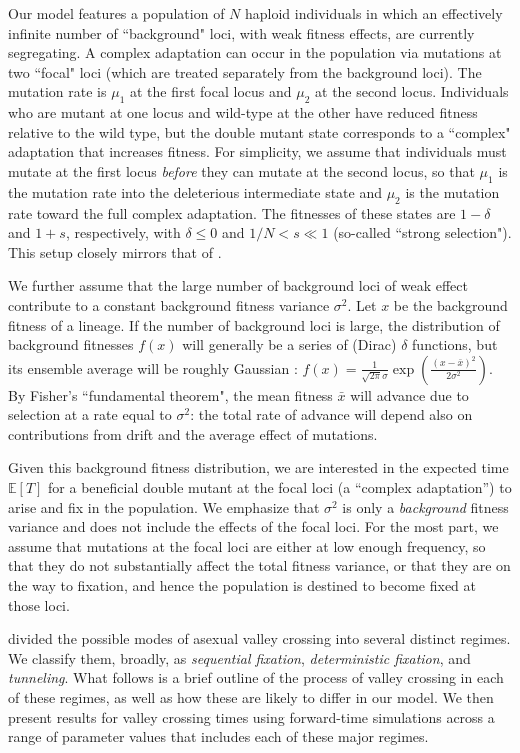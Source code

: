 \documentclass[rmp]{revtex4}
\begin{document}
\begin{spacing}{1.5}
Our model features a population of $N$ haploid individuals in which an effectively infinite number of ``background" loci, with weak fitness effects, are currently segregating.
A complex adaptation can occur in the population via mutations at two ``focal" loci (which are treated separately from the background loci).
The mutation rate is $\mu_1$ at the first focal locus and $\mu_2$ at the second locus.
Individuals who are mutant at one locus and wild-type at the other have reduced fitness relative to the wild type, but the double mutant state corresponds to a ``complex" adaptation that increases fitness.
For simplicity, we assume that individuals must mutate at the first locus \emph{before} they can mutate at the second locus, so that $\mu_1$ is the mutation rate into the deleterious intermediate state and $\mu_2$ is the mutation rate toward the full complex adaptation.
The fitnesses of these states are $1-\delta$ and $1+s$, respectively, with $\delta \leq 0$ and $1/N < s \ll 1$ (so-called ``strong selection").
This setup closely mirrors that of \citep{weissman_2009}.

We further assume that the large number of background loci of weak effect contribute to a constant background fitness variance $\sigma^2$.
Let $x$ be the background fitness of a lineage.
If the number of background loci is large, the distribution of background fitnesses $f(x)$ will generally be a series of (Dirac) $\delta$ functions, but its ensemble average will be roughly Gaussian \citep{good_desai_2014}: $f(x) = \frac{1}{\sqrt{2\pi}\sigma} \exp (\frac{(x-\bar{x})^2}{2\sigma^2})$.
By Fisher's ``fundamental theorem", the mean fitness $\bar{x}$ will advance due to selection at a rate equal to $\sigma^2$: the total rate of advance will depend also on contributions from drift and the average effect of mutations.

Given this background fitness distribution, we are interested in the expected time $\mathbb{E}\left[ T\right]$ for a beneficial double mutant at the focal loci (a ``complex adaptation'') to arise and fix in the population.
We emphasize that $\sigma^2$ is only a \emph{background} fitness variance and does not include the effects of the focal loci.
For the most part, we assume that mutations at the focal loci are either at low enough frequency, so that they do not substantially affect the total fitness variance, or that they are on the way to fixation, and hence the population is destined to become fixed at those loci.

\citet{weissman_2009} divided the possible modes of asexual valley crossing into several distinct regimes.
We classify them, broadly, as \emph{sequential fixation}, \emph{deterministic fixation}, and \emph{tunneling}.
What follows is a brief outline of the process of valley crossing in each of these regimes, as well as how these are likely to differ in our model.
We then present results for valley crossing times using forward-time simulations across a range of parameter values that includes each of these major regimes.


\end{spacing}
\end{document}
